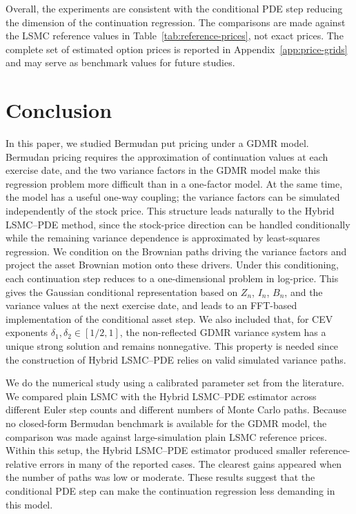 \documentclass[pdflatex,sn-mathphys-num]{sn-jnl}
\theoremstyle{thmstyleone}%
\theoremstyle{thmstylethree}%
\theoremstyle{thmstyletwo}%
\begin{document}
Overall, the experiments are consistent with the conditional PDE step reducing
the dimension of the continuation regression. The comparisons are
made against the LSMC reference values in Table~\ref{tab:reference-prices}, not exact prices. The complete set of estimated option prices is reported in Appendix~\ref{app:price-grids} and may serve as benchmark values for future studies.

\section{Conclusion}\label{sec:conclusion}

In this paper, we studied Bermudan put pricing under a GDMR model. Bermudan pricing requires the approximation of continuation values at each exercise date, and the two variance factors in the GDMR model make this regression problem more difficult than in a one-factor model. At the same time, the model has a useful one-way coupling; the variance factors can be simulated independently of the stock price. This structure leads naturally to the Hybrid LSMC--PDE method, since the stock-price direction can be handled conditionally while the remaining variance dependence is approximated by least-squares regression. We condition on the Brownian paths driving the variance factors and project the asset Brownian motion onto these drivers. Under this conditioning, each continuation step reduces to a one-dimensional problem in log-price. This gives the Gaussian conditional representation based on $Z_n$, $I_n$, $B_n$, and the variance values at the next exercise date, and leads to an FFT-based implementation of the conditional asset step. We also included that, for CEV exponents $\delta_1,\delta_2 \in [1/2,1]$, the non-reflected GDMR variance system has a unique strong solution and remains nonnegative. This property is needed since the construction of Hybrid LSMC--PDE relies on valid simulated variance paths.

We do the numerical study using a calibrated parameter set from the literature. We compared plain LSMC with the Hybrid LSMC--PDE estimator across different Euler step counts and different numbers of Monte Carlo paths. Because no closed-form Bermudan benchmark is available for the GDMR model, the comparison was made against large-simulation plain LSMC reference prices. Within this setup, the Hybrid LSMC--PDE estimator produced smaller reference-relative errors in many of the reported cases. The clearest gains appeared when the number of paths was low or moderate. These results suggest that the conditional PDE step can make the continuation regression less demanding in this model.
\end{document}
